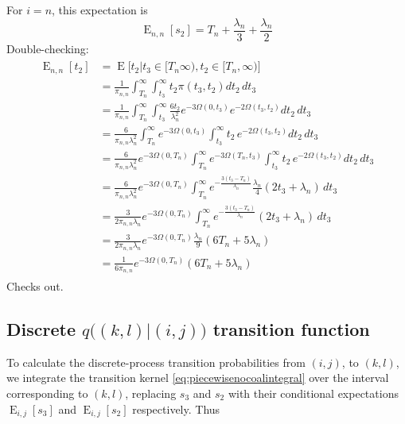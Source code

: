 \documentclass{article}
\DeclareMathOperator{\E}{E}
\begin{document}
For $i=n$, this expectation is 
\begin{equation}
    \E_{n,n}[s_2] = T_n+\frac{\lambda_n}{3}+\frac{\lambda_n}{2}
\end{equation}
Double-checking:
\begin{align}
    \begin{split}
        \E_{n,n}[t_2] &= \E\big[t_2|t_3 \in [T_n \infty),t_2 \in [T_n,\infty) \big]\\
                      &= \frac{1}{\pi_{n,n}}\int_{T_n}^{\infty}\int_{t_3}^{\infty}t_2\pi(t_3,t_2)dt_2\,dt_3\\
                      &= \frac{1}{\pi_{n,n}}\int_{T_n}^{\infty}\int_{t_3}^{\infty}
                        \frac{6t_2}{\lambda_n^2}e^{-3\Omega(0,t_3)}e^{-2\Omega(t_3,t_2)}dt_2\,dt_3\\
                      &= \frac{6}{\pi_{n,n}\lambda_n^2}\int_{T_n}^{\infty}
                        e^{-3\Omega(0,t_3)}\int_{t_3}^{\infty}t_2\,e^{-2\Omega(t_3,t_2)}dt_2\,dt_3\\
                      &= \frac{6}{\pi_{n,n}\lambda_n^2}e^{-3\Omega(0,T_n)}
                        \int_{T_n}^{\infty}
                        e^{-3\Omega(T_n,t_3)}\int_{t_3}^{\infty}t_2\,e^{-2\Omega(t_3,t_2)}dt_2\,dt_3\\
                      &= \frac{6}{\pi_{n,n}\lambda_n^2}e^{-3\Omega(0,T_n)}
                        \int_{T_n}^{\infty}
                        e^{-\frac{3(t_3-T_n)}{\lambda_n}}\frac{\lambda_n}{4}(2t_3+\lambda_n)
                        \,dt_3\\
                      &= \frac{3}{2\pi_{n,n}\lambda_n}e^{-3\Omega(0,T_n)}
                        \int_{T_n}^{\infty}
                        e^{-\frac{3(t_3-T_n)}{\lambda_n}}(2t_3+\lambda_n)
                        \,dt_3\\
                      &= \frac{3}{2\pi_{n,n}\lambda_n}e^{-3\Omega(0,T_n)}
                        \frac{\lambda_n}{9}(6T_n+5\lambda_n)\\
                      &= \frac{1}{6\pi_{n,n}}e^{-3\Omega(0,T_n)}
                        (6T_n+5\lambda_n)
    \end{split}
\end{align}
Checks out.

\subsection{Discrete $q\big((k,l)|(i,j)\big)$ transition function}

To calculate the discrete-process transition probabilities from $(i,j)$, to
$(k,l)$, we integrate the transition kernel \eqref{eq:piecewisenocoalintegral}
over the interval corresponding to $(k,l)$, replacing $s_3$ and $s_2$ with
their conditional expectations $\E_{i,j}[s_3]$ and $\E_{i,j}[s_2]$
respectively. Thus
\end{document}
